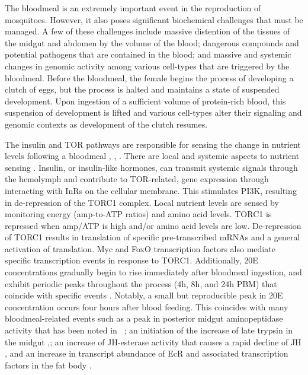The bloodmeal is an extremely important event in the reproduction of mosquitoes.
%
However, it also poses significant biochemical challenges that must be managed.
%
A few of these challenges include massive distention of the tissues of the midgut and abdomen by the volume of the blood; dangerous compounds and potential pathogens that are contained in the blood; and massive and systemic changes in genomic activity among various cell-types that are triggered by the bloodmeal.
%
Before the bloodmeal, the female begins the process of developing a clutch of eggs, but the process is halted and maintains a state of suspended development.
%
Upon ingestion of a sufficient volume of protein-rich blood, this suspension of development is lifted and various cell-types alter their signaling and genomic contexts as development of the clutch resumes.


The insulin and \gls{TOR} pathways are responsible for sensing the change in nutrient levels following a bloodmeal \cite{Roy2007}, \cite{Hietakangas2009}, \cite{Brandon2008}.
%
There are local and systemic aspects to nutrient sensing \cite{Hietakangas2009}.
%
Insulin, or insulin-like hormones, can transmit systemic signals through the hemolymph and contribute to \gls{TOR}-related, gene expression through interacting with \glspl{InR} on the cellular membrane.
%
This stimulates \gls{PI3K}, resulting in de-repression of the TORC1 complex.
%
Local nutrient levels are sensed by monitoring energy (\gls{amp}-to-\gls{ATP} ratios) and amino acid levels.
%
TORC1 is repressed when \gls{amp}/\gls{ATP} is high and/or amino acid levels are low.
%
De-repression of TORC1 results in translation of specific pre-transcribed mRNAs and a general activation of translation.
%
Myc and FoxO transcription factors also mediate specific transcription events in response to TORC1.
%
Additionally, \gls{20E} concentrations gradually begin to rise immediately after bloodmeal ingestion, and exhibit periodic peaks throughout the process (4h, 8h, and 24h \gls{PBM}) that coincide with specific events \cite{Hagedorn1975}.
%
Notably, a small but reproducible peak in \gls{20E} concentration occurs four hours after blood feeding.
%
This coincides with many bloodmeal-related events such as a peak in posterior midgut aminopeptidase activity that has been noted in \As\ \cite{Billingsley1991}; an initiation of the increase of late trypsin in the midgut \cite{Barillasmury1991},\cite{Graf1988}; an increase of \gls{JH}-esterase activity that causes a rapid decline of \gls{JH} \cite{Shapiro1986}, and an increase in transcript abundance of \gls{EcR} and associated transcription factors in the fat body \cite{Raikhel1999}.


